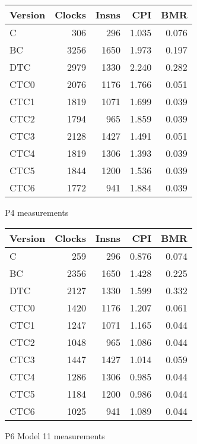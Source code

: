 \documentclass[10pt,a4paper]{article}
\begin{document}
\begin{figure}[htb]
\begin{center}
\begin{tabular}{|@{~}l|r|r|r|r|}
\hline
Version & Clocks & Insns & CPI & BMR \\
\hline
C    &  306 &  296 & 1.035 & 0.076 \\
BC   & 3256 & 1650 & 1.973 & 0.197 \\
DTC  & 2979 & 1330 & 2.240 & 0.282 \\
CTC0 & 2076 & 1176 & 1.766 & 0.051 \\
CTC1 & 1819 & 1071 & 1.699 & 0.039 \\
CTC2 & 1794 &  965 & 1.859 & 0.039 \\
CTC3 & 2128 & 1427 & 1.491 & 0.051 \\
CTC4 & 1819 & 1306 & 1.393 & 0.039 \\
CTC5 & 1844 & 1200 & 1.536 & 0.039 \\
CTC6 & 1772 &  941 & 1.884 & 0.039 \\
\hline
\end{tabular}
\end{center}
\caption{P4 measurements}
\label{fig:measurements-p4}
\end{figure}

\begin{figure}[htb]
\begin{center}
\begin{tabular}{|@{~}l|r|r|r|r|}
\hline
Version & Clocks & Insns & CPI & BMR \\
\hline
C    &  259 &  296 & 0.876 & 0.074 \\
BC   & 2356 & 1650 & 1.428 & 0.225 \\
DTC  & 2127 & 1330 & 1.599 & 0.332 \\
CTC0 & 1420 & 1176 & 1.207 & 0.061 \\
CTC1 & 1247 & 1071 & 1.165 & 0.044 \\
CTC2 & 1048 &  965 & 1.086 & 0.044 \\
CTC3 & 1447 & 1427 & 1.014 & 0.059 \\
CTC4 & 1286 & 1306 & 0.985 & 0.044 \\
CTC5 & 1184 & 1200 & 0.986 & 0.044 \\
CTC6 & 1025 &  941 & 1.089 & 0.044 \\
\hline
\end{tabular}
\end{center}
\caption{P6 Model 11 measurements}
\label{fig:measurements-p6m11}
\end{figure}
\end{document}
